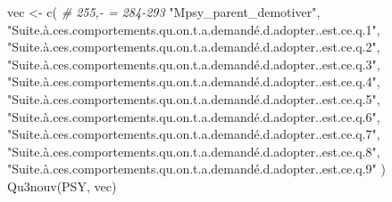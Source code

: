 \documentclass[
]{article}
\newenvironment{Shaded}{\begin{snugshade}}{\end{snugshade}}
\newcommand{\CommentTok}[1]{\textcolor[rgb]{0.56,0.35,0.01}{\textit{#1}}}
\newcommand{\FunctionTok}[1]{\textcolor[rgb]{0.00,0.00,0.00}{#1}}
\newcommand{\NormalTok}[1]{#1}
\newcommand{\OtherTok}[1]{\textcolor[rgb]{0.56,0.35,0.01}{#1}}
\newcommand{\StringTok}[1]{\textcolor[rgb]{0.31,0.60,0.02}{#1}}
\begin{document}
\begin{Shaded}
\begin{Highlighting}[]
\NormalTok{vec }\OtherTok{\textless{}{-}} \FunctionTok{c}\NormalTok{(          }\CommentTok{\# 255,{-} = 284{-}293}
  \StringTok{"Mpsy\_parent\_demotiver"}\NormalTok{,}
  \StringTok{"Suite.à.ces.comportements.qu.on.t.a.demandé.d.adopter..est.ce.q.1"}\NormalTok{,}
  \StringTok{"Suite.à.ces.comportements.qu.on.t.a.demandé.d.adopter..est.ce.q.2"}\NormalTok{,}
  \StringTok{"Suite.à.ces.comportements.qu.on.t.a.demandé.d.adopter..est.ce.q.3"}\NormalTok{,}
  \StringTok{"Suite.à.ces.comportements.qu.on.t.a.demandé.d.adopter..est.ce.q.4"}\NormalTok{,}
  \StringTok{"Suite.à.ces.comportements.qu.on.t.a.demandé.d.adopter..est.ce.q.5"}\NormalTok{,}
  \StringTok{"Suite.à.ces.comportements.qu.on.t.a.demandé.d.adopter..est.ce.q.6"}\NormalTok{,}
  \StringTok{"Suite.à.ces.comportements.qu.on.t.a.demandé.d.adopter..est.ce.q.7"}\NormalTok{,}
  \StringTok{"Suite.à.ces.comportements.qu.on.t.a.demandé.d.adopter..est.ce.q.8"}\NormalTok{,}
  \StringTok{"Suite.à.ces.comportements.qu.on.t.a.demandé.d.adopter..est.ce.q.9"}
\NormalTok{)}
\FunctionTok{Qu3nouv}\NormalTok{(PSY, vec)}
\end{Highlighting}
\end{Shaded}
\end{document}
